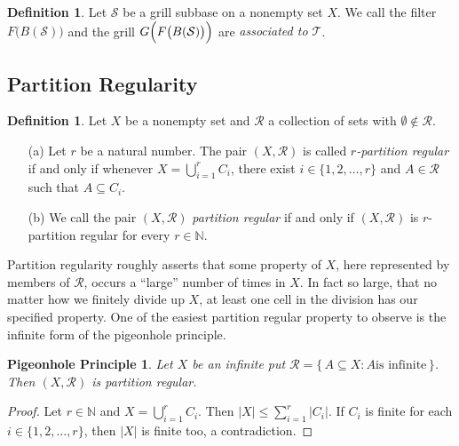 \documentclass[12pt]{article}
\theoremstyle{plain}
\newtheorem*{php}{Pigeonhole Principle}
\theoremstyle{definition}
\newtheorem{defn}[thm]{Definition}
\newcommand{\bbN}{\mathbb{N}}
\newcommand{\calR}{\mathcal{R}}
\newcommand{\calS}{\mathcal{S}}
\newcommand{\calT}{\mathcal{T}}
\begin{document}
\begin{defn}
  Let $\calS$ be a grill subbase on a nonempty set $X$.
  We call the filter $F\bigl(B(\calS)\bigr)$ and the grill
  $G\Bigl(F\bigl(B(\calS)\bigr)\Bigr)$ are \textsl{associated to
    $\calT$}.
\end{defn}

\subsection{Partition Regularity}

\begin{defn}
  Let $X$ be a nonempty set and $\calR$ a collection of sets with
  $\emptyset\not\in \calR$. 
  \begin{itemize}
    \item[(a)] Let $r$ be a natural number. 
      The pair $(X, \calR)$ is called \textsl{\mbox{$r$-partition}
        regular} if and only if whenever $X = \bigcup_{i=1}^r
      C_i$, there exist $i \in \{1, 2, \ldots, r\}$ and $A \in \calR$
      such that $A \subseteq C_i$.

    \item[(b)] We call the pair $(X, \calR)$ \textsl{partition
        regular} if and only if $(X, \calR)$ is \mbox{$r$-partition}
      regular for every $r \in \bbN$.
  \end{itemize}
\end{defn}


Partition regularity roughly asserts that some property of $X$, here
represented by members of $\calR$, occurs a ``large'' number of times
in $X$.
In fact so large, that no matter how we finitely divide up $X$, at
least one cell in the division has our specified property. 
One of the easiest partition regular property to observe is the
infinite form of the pigeonhole principle.

\begin{php}
  Let $X$ be an infinite put $\calR = \{\, A \subseteq X : \mbox{$A$
    is infinite} \,\}$.
  Then $(X, \calR)$ is partition regular.
\end{php}
\begin{proof}
  Let $r \in \bbN$ and $X = \bigcup_{i=1}^r C_i$.
  Then $|X| \le \sum_{i=1}^r |C_i|$.
  If $C_i$ is finite for each $i \in \{1, 2, \ldots, r\}$,
  then $|X|$ is finite too, a contradiction.
\end{proof}
\end{document}
